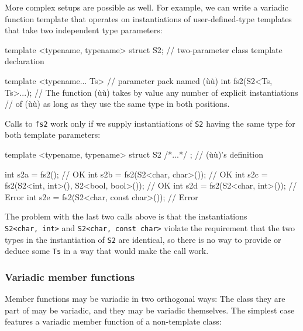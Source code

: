\noindent More complex setups are possible as well. For example, we can write a
variadic function template that operates on instantiations of
user-defined-type templates that take two independent type parameters:

\begin{emcppslisting}[emcppsbatch=e15]
template <typename, typename>
struct S2;                  // two-parameter class template declaration

template <typename... Ts>   // parameter pack named (ù{}ù)
int fs2(S2<Ts, Ts>...);
    // The function (ù{}ù) takes by value any number of explicit instantiations
    // of (ù{}ù) as long as they use the same type in both positions.
\end{emcppslisting}
    

\noindent Calls to \lstinline!fs2! work only if we supply instantiations of
\lstinline!S2! having the same type for both template parameters:

\begin{emcppslisting}[emcppsbatch=e15]
template <typename, typename> struct S2 { /*...*/ };  // (ù{}ù)'s definition

int s2a = fs2();                                      // OK
int s2b = fs2(S2<char, char>());                      // OK
int s2c = fs2(S2<int, int>(), S2<bool, bool>());      // OK
int s2d = fs2(S2<char, int>());                       // Error
int s2e = fs2(S2<char, const char>());                // Error
\end{emcppslisting}
    

\noindent The problem with the last two calls above is that the instantiations
\lstinline!S2<char,!~\lstinline!int>! and
\lstinline!S2<char,!~\lstinline!const!~\lstinline!char>! violate the requirement
that the two types in the instantiation of \lstinline!S2! are identical, so
there is no way to provide or deduce some \lstinline!Ts! in a way that
would make the call work.

\subsubsection[Variadic member functions]{Variadic member functions}\label{variadic-member-functions}

Member functions may be variadic in two orthogonal ways: The class they
are part of may be variadic, and they may be variadic themselves. The
simplest case features a variadic member function of a non-template
class:

